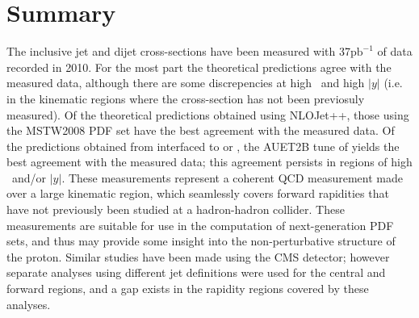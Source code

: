 

\section{Summary}
The inclusive jet and dijet cross-sections have been measured with 37$\mathrm{pb}^{-1}$ of data recorded in 2010. For the most part the theoretical predictions agree with the measured data, although there are some discrepencies at high \pt~and high $|y|$ (i.e. in the kinematic regions where the cross-section has not been previosuly measured). Of the theoretical predictions obtained using NLOJet++, those using the MSTW2008 PDF set have the best agreement with the measured data. Of the predictions obtained from \powheg interfaced to \pythia or \herwig, the AUET2B tune of \pythia yields the best agreement with the measured data; this agreement persists in regions of high \pt~and/or $|y|$. These measurements represent a coherent QCD measurement made over a large kinematic region, which seamlessly covers forward rapidities that have not previously been studied at a hadron-hadron collider. These measurements are suitable for use in the computation of next-generation PDF sets, and thus may provide some insight into the non-perturbative structure of the proton. Similar studies have been made using the CMS detector; however separate analyses using different jet definitions were used for the central and forward regions, and a gap exists in the rapidity regions covered by these analyses. 



